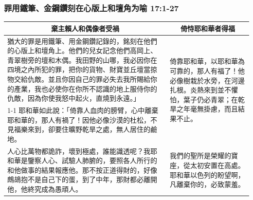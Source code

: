 \subsubsection{罪用鐵筆、金鋼鑽刻在心版上和壇角为喻 17:1-27}
\begin{table}[H]
\centering
\begin{tabular}{p{11.75cm}|p{5.50cm}}\hline\hline
\multicolumn{1}{c|}{棄主賴人和偶像者受禍}&\multicolumn{1}{c}{倚恃耶和華者得福}\\\hline
猶大的罪是用鐵筆、用金鋼鑽記錄的，銘刻在他們的心版上和壇角上。他們的兒女記念他們高岡上、青翠樹旁的壇和木偶。我田野的山哪，我必因你在四境之內所犯的罪，把你的貨物、財寶並丘壇當掠物交給仇敵。並且你因自己的罪必失去我所賜給你的產業，我也必使你在你所不認識的地上服侍你的仇敵，因為你使我怒中起火，直燒到永遠。」
&\multirow{2}{5.6cm}{倚靠耶和華，以耶和華為可靠的，那人有福了！他必像樹栽於水旁，在河邊扎根。炎熱來到並不懼怕，葉子仍必青翠；在乾旱之年毫無掛慮，而且結果不止。}\\\cline{1-1}
耶和華如此說：「倚靠人血肉的膀臂，心中離棄耶和華的，那人有禍了！因他必像沙漠的杜松，不見福樂來到，卻要住曠野乾旱之處，無人居住的鹼地。&\\\hline

人心比萬物都詭詐，壞到極處，誰能識透呢？我耶和華是鑒察人心、試驗人肺腑的，要照各人所行的和他做事的結果報應他。那不按正道得財的，好像鷓鴣抱不是自己下的蛋，到了中年，那財都必離開他，他終究成為愚頑人。
&我們的聖所是榮耀的寶座，從太初安置在高處。耶和華以色列的盼望啊，凡離棄你的，必致蒙羞。\\\hline
\end{tabular}
\end{table}


